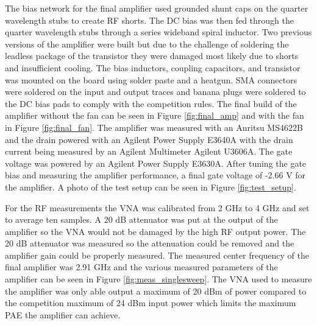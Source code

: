 The bias network for the final amplifier used grounded shunt caps on the quarter wavelength stubs to create RF shorts. The DC bias was then fed through the quarter wavelength stubs through a series wideband spiral inductor. Two previous versions of the amplifier were built but due to the challenge of soldering the leadless package of the transistor they were damaged most likely due to shorts and insufficient cooling. The bias inductors, coupling capacitors, and transistor was mounted on the board using solder paste and a heatgun. SMA connectors were soldered on the input and output traces and banana plugs were soldered to the DC bias pads to comply with the competition rules. The final build of the amplifier without the fan can be seen in Figure \ref{fig:final_amp} and with the fan in Figure \ref{fig:final_fan}. The amplifier was measured with an Anritsu MS4622B and the drain powered with an Agilent Power Supply E3640A with the drain current being measured by an Agilent Multimeter Agilent U3606A. The gate voltage was powered by an Agilent Power Supply E3630A. After tuning the gate bias and measuring the amplifier performance, a final gate voltage of -2.66 V for the amplifier. A photo of the test setup can be seen in Figure \ref{fig:test_setup}.




For the RF measurements the VNA was calibrated from 2 GHz to 4 GHz and set to average ten samples. A 20 dB attenuator was put at the output of the amplifier so the VNA would not be damaged by the high RF output power. The 20 dB attenuator was measured so the attenuation could be removed and the amplifier gain could be properly measured. The measured center frequency of the final amplifier was 2.91 GHz and the various measured parameters of the amplifier can be seen in Figure \ref{fig:meas_singlesweep}. The VNA used to measure the amplifier was only able output a maximum of 20 dBm of power compared to the competition maximum of 24 dBm input power which limits the maximum PAE the amplifier can achieve.

